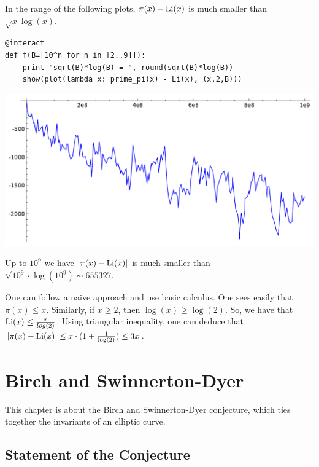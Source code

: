 \documentclass{book}
\begin{document}
In the range of the following plots, $\pi(x) - \operatorname{Li}(x)$ is
much smaller than $\sqrt{x}\log(x)$.
\begin{lstlisting}
@interact
def f(B=[10^n for n in [2..9]]):
    print "sqrt(B)*log(B) = ", round(sqrt(B)*log(B))
    show(plot(lambda x: prime_pi(x) - Li(x), (x,2,B)))
\end{lstlisting}
\begin{center}
\includegraphics[width=.7\textwidth]{pics/pi_minus_li-1e9.pdf}
\end{center}
Up to $10^9$ we have $|\pi(x)-\operatorname{Li}(x)|$ is much
smaller than $\sqrt{10^9}\cdot \log(10^9) \sim  \num{655327}$.


One can follow a naive approach and use basic calculus.
One sees easily that $\pi(x) \leq x$. Similarly, if $x \geq 2$, then $\log(x) \geq \log(2)$. So, we have that $\operatorname{Li}(x) \leq \frac{x}{log(2)} $.
Using triangular inequality, one can deduce that $|\pi(x)-\operatorname{Li}(x)| \leq x \cdot (1 + \frac{1}{\log(2)}) \leq 3x$.


\chapter{Birch and Swinnerton-Dyer}\label{ch:bsd}

This chapter is about the Birch and Swinnerton-Dyer conjecture,
which ties together the invariants of an elliptic curve.

\section{Statement of the Conjecture}
\end{document}
